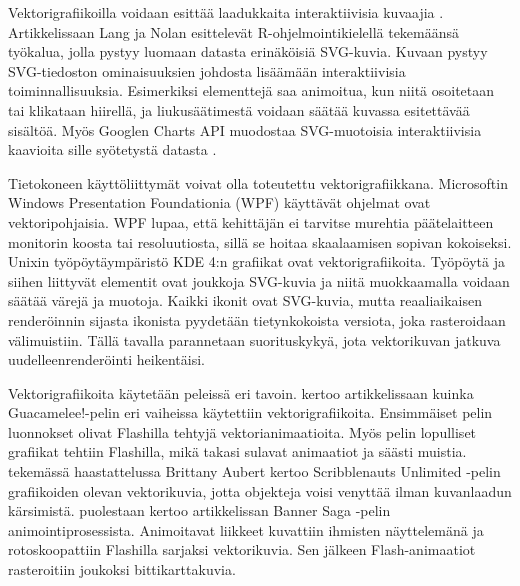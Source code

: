 \documentclass[utf8,bachelor]{gradu3}
\begin{document}
Vektorigrafiikoilla voidaan esittää laadukkaita interaktiivisia kuvaajia \parencite{RefWorks:doc:5bdc736ae4b05afcfde5d6e4}. Artikkelissaan Lang ja Nolan esittelevät R-ohjelmointikielellä tekemäänsä työkalua, jolla pystyy luomaan datasta erinäköisiä SVG-kuvia. Kuvaan pystyy SVG-tiedoston ominaisuuksien johdosta lisäämään interaktiivisia toiminnallisuuksia. Esimerkiksi elementtejä saa animoitua, kun niitä osoitetaan tai klikataan hiirellä, ja liukusäätimestä voidaan säätää kuvassa esitettävää sisältöä. \parencite{RefWorks:doc:5bdc736ae4b05afcfde5d6e4} Myös Googlen Charts API muodostaa SVG-muotoisia interaktiivisia kaavioita sille syötetystä datasta \parencite{RefWorks:doc:5bde1508e4b0afdabde34e20}.

Tietokoneen käyttöliittymät voivat olla toteutettu vektorigrafiikkana. Microsoftin Windows Presentation Foundationia (WPF) käyttävät ohjelmat ovat vektoripohjaisia. WPF lupaa, että kehittäjän ei tarvitse murehtia päätelaitteen monitorin koosta tai resoluutiosta, sillä se hoitaa skaalaamisen sopivan kokoiseksi. \parencite{RefWorks:doc:5bde3d66e4b0a1f99c63ae5a} Unixin työpöytäympäristö KDE 4:n grafiikat ovat vektorigrafiikoita. Työpöytä ja siihen liittyvät elementit ovat joukkoja SVG-kuvia ja niitä muokkaamalla voidaan säätää värejä ja muotoja. Kaikki ikonit ovat SVG-kuvia, mutta reaaliaikaisen renderöinnin sijasta ikonista pyydetään tietynkokoista versiota, joka rasteroidaan välimuistiin. Tällä tavalla parannetaan suorituskykyä, jota vektorikuvan jatkuva uudelleenrenderöinti heikentäisi. \parencite{RefWorks:doc:5bded7f3e4b09dfad48b846c}

Vektorigrafiikoita käytetään peleissä eri tavoin. \textcite{RefWorks:doc:5bdc818be4b0965708b5a0f0} kertoo artikkelissaan kuinka Guacamelee!-pelin eri vaiheissa käytettiin vektorigrafiikoita. Ensimmäiset pelin luonnokset olivat Flashilla tehtyjä vektorianimaatioita. Myös pelin lopulliset grafiikat tehtiin Flashilla, mikä takasi sulavat animaatiot ja säästi muistia. \parencite{RefWorks:doc:5bdc818be4b0965708b5a0f0} \textcite{RefWorks:doc:5bdc7473e4b05afcfde5d742} tekemässä haastattelussa Brittany Aubert kertoo Scribblenauts Unlimited -pelin grafiikoiden olevan vektorikuvia, jotta objekteja voisi venyttää ilman kuvanlaadun kärsimistä. \textcite{RefWorks:doc:5bd88176e4b0afdabde2b8e2} puolestaan kertoo artikkelissan Banner Saga -pelin animointiprosessista. Animoitavat liikkeet kuvattiin ihmisten näyttelemänä ja rotoskoopattiin Flashilla sarjaksi vektorikuvia. Sen jälkeen Flash-animaatiot rasteroitiin joukoksi bittikarttakuvia. \parencite{RefWorks:doc:5bd88176e4b0afdabde2b8e2}
\end{document}
